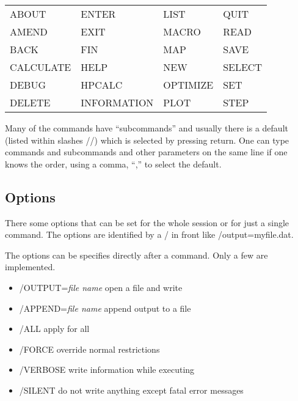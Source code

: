 \documentclass[12pt]{article}
\begin{document}
\begin{tabular}{llll}
ABOUT           & ENTER           & LIST           & QUIT    \\
AMEND           & EXIT            & MACRO          & READ    \\
BACK            & FIN             & MAP            & SAVE    \\
CALCULATE       & HELP            & NEW            & SELECT  \\
DEBUG           & HPCALC          & OPTIMIZE       & SET    \\
DELETE          & INFORMATION     & PLOT           & STEP     \\
\end{tabular}

Many of the commands have ``subcommands'' and usually there is a
default (listed within slashes //) which is selected by pressing
return.  One can type commands and subcommands and other parameters on
the same line if one knows the order, using a comma, ``,'' to select
the default.

\subsection{Options}

There some options that can be set for the whole session or for just a
single command.  The options are identified by a / in front like
/output=myfile.dat.

The options can be specifies directly after a command.  Only a few are
implemented.

\begin{itemize}
\item /OUTPUT={\em file name} open a file and write
\item /APPEND={\em file name} append output to a file
\item /ALL apply for all
\item /FORCE override normal restrictions
\item /VERBOSE write information while executing
\item /SILENT do not write anything except fatal error messages
\end{itemize}
\end{document}
